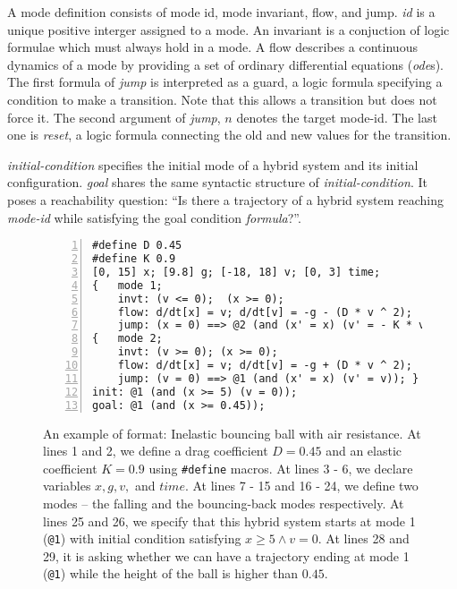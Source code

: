A mode definition consists of mode id, mode invariant, flow, and jump.
\textit{id} is a unique positive interger assigned to a mode. An
invariant is a conjuction of logic formulae which must always hold in
a mode. A flow describes a continuous dynamics of a mode by providing
a set of ordinary differential equations (\textit{ode}s). The first
formula of \textit{jump} is interpreted as a guard, a logic formula
specifying a condition to make a transition. Note that this allows a
transition but does not force it. The second argument of
\textit{jump}, $n$ denotes the target mode-id. The last one is
\textit{reset}, a logic formula connecting the old and new values for
the transition.

\textit{initial-condition} specifies the initial mode of a hybrid
system and its initial configuration. \textit{goal} shares the same
syntactic structure of \textit{initial-condition}. It poses a
reachability question: ``Is there a trajectory of a hybrid system
reaching \textit{mode-id} while satisfying the goal condition
\textit{formula}?''.

\begin{figure}
  \centering
  \begin{Verbatim}[fontfamily=courier, frame=single, framesep=1mm,
  numbers=left, fontsize=\scriptsize]
#define D 0.45
#define K 0.9
[0, 15] x; [9.8] g; [-18, 18] v; [0, 3] time;
{   mode 1;
    invt: (v <= 0);  (x >= 0);
    flow: d/dt[x] = v; d/dt[v] = -g - (D * v ^ 2);
    jump: (x = 0) ==> @2 (and (x' = x) (v' = - K * v)); }
{   mode 2;
    invt: (v >= 0); (x >= 0);
    flow: d/dt[x] = v; d/dt[v] = -g + (D * v ^ 2);
    jump: (v = 0) ==> @1 (and (x' = x) (v' = v)); }
init: @1 (and (x >= 5) (v = 0));
goal: @1 (and (x >= 0.45));
\end{Verbatim}
\caption{An example of \drh{} format: Inelastic bouncing ball with air
  resistance. At lines 1 and 2, we define a drag coefficient $D = 0.45$
  and an elastic coefficient $K = 0.9$ using \texttt{\#define} macros.
  At lines 3 - 6, we declare variables $x, g, v,$ and $time$. At lines
  7 - 15 and 16 - 24, we define two modes -- the falling and the
  bouncing-back modes respectively. At lines 25 and 26, we specify
  that this hybrid system starts at mode 1 (\texttt{@1}) with initial
  condition satisfying $x \ge 5 \land v = 0$. At lines 28 and 29, it
  is asking whether we can have a trajectory ending at mode 1
  (\texttt{@1}) while the height of the ball is higher than $0.45$.}
\label{fig:bouncing-ball-drh}
\end{figure}

